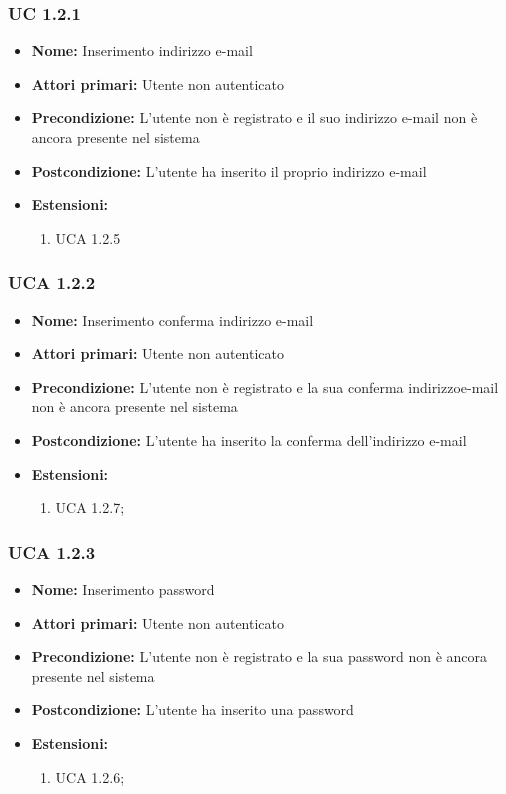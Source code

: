 \subsubsection{UC 1.2.1}%
\begin{itemize}
\item \textbf{Nome:} Inserimento indirizzo e-mail
\item \textbf{Attori primari:} Utente non autenticato
\item \textbf{Precondizione:} L’utente non è registrato e il suo indirizzo e-mail non è ancora presente nel sistema
\item \textbf{Postcondizione:}  L’utente ha inserito il proprio indirizzo e-mail
\item \textbf{Estensioni:}
	\begin{enumerate}
		\item UCA 1.2.5
	\end{enumerate}
\end{itemize}

\subsubsection{UCA 1.2.2}%
\begin{itemize}
\item \textbf{Nome:} Inserimento conferma indirizzo e-mail
\item \textbf{Attori primari:} Utente non autenticato
\item \textbf{Precondizione:} L’utente non è registrato e la sua conferma indirizzoe-mail non è ancora presente nel sistema
\item \textbf{Postcondizione:}  L’utente ha inserito la conferma dell'indirizzo e-mail
\item \textbf{Estensioni:}
	\begin{enumerate}
		\item UCA 1.2.7;
	\end{enumerate} 
\end{itemize}


\subsubsection{UCA 1.2.3}%
\begin{itemize}
\item \textbf{Nome:} Inserimento password
\item \textbf{Attori primari:} Utente non autenticato
\item \textbf{Precondizione:} L’utente non è registrato e la sua password non è ancora presente nel sistema
\item \textbf{Postcondizione:} L’utente ha inserito una password
\item \textbf{Estensioni:}
	\begin{enumerate}
		\item UCA 1.2.6;
	\end{enumerate}
\end{itemize}

